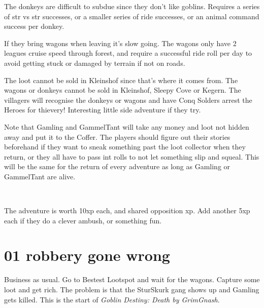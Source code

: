 The donkeys are difficult to subdue since they don't like goblins. Requires a series of str vs str successes, or a smaller series of ride successes, or an animal command success per donkey. 

If they bring wagons when leaving it's slow going. The wagons only have 2 leagues cruise speed through forest, and require a successful ride roll per day to avoid getting stuck or damaged by terrain if not on roads.

The loot cannot be sold in Kleinshof since that's where it comes from. The wagons or donkeys cannot be sold in Kleinshof, Sleepy Cove or Kegern. The villagers will recognise the donkeys or wagons and have Conq Solders arrest the Heroes for thievery! Interesting little side adventure if they try.

Note that Gamling and GammelTant will take any money and loot not hidden away and put it to the Coffer. The players should figure out their stories beforehand if they want to sneak something past the loot collector when they return, or they all have to pass int rolls to not let something slip and squeal. This will be the same for the return of every adventure as long as Gamling or GammelTant are alive.

\

The adventure is worth 10xp each, and shared opposition xp. Add another 5xp each if they do a clever ambush, or something fun.











\clearpage
\section*{01 robbery gone wrong}
\label{01robberygonewrong}

Business as usual. Go to Bestest Lootspot and wait for the wagons. Capture some loot and get rich. The problem is that the SturSkurk gang shows up and Gamling gets killed. This is the start of \emph{Goblin Destiny: Death by GrimGnash}.


